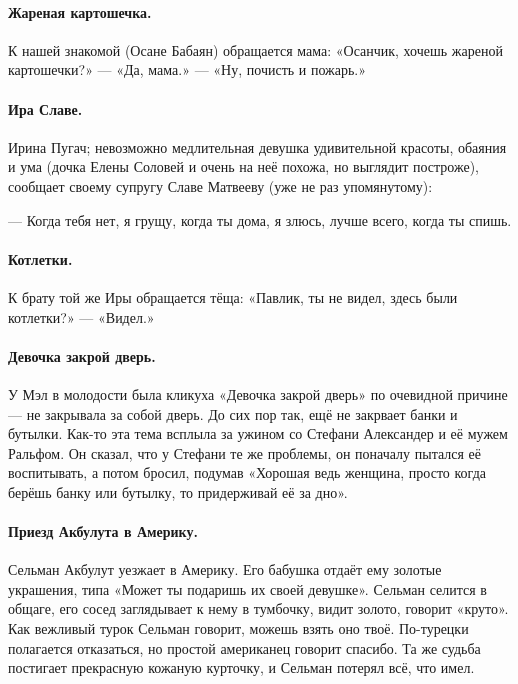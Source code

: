 \documentclass{book}
\begin{document}
\paragraph{Жареная картошечка.}
К нашей знакомой (Осане Бабаян) обращается мама:
«Осанчик, хочешь жареной картошечки?» --- «Да, мама.» --- «Ну, почисть и пожарь.»

\paragraph{Ира Славе.}
Ирина Пугач; невозможно медлительная девушка удивительной красоты, обаяния и ума (дочка Елены Соловей и очень на неё похожа, но выглядит построже), сообщает своему супругу Славе Матвееву (уже не раз упомянутому):

--- Когда тебя нет, я грущу, когда ты дома, я злюсь, лучше всего, когда ты спишь.

\paragraph{Котлетки.}
К брату той же Иры обращается тёща:
«Павлик, ты не видел, здесь были котлетки?» --- «Видел.»

\paragraph{Девочка закрой дверь.}
У Мэл в молодости была кликуха «Девочка закрой дверь» по очевидной причине --- не закрывала за собой дверь.
До сих пор так, ещё не закрвает банки и бутылки.
Как-то эта тема всплыла за ужином со Стефани Александер и её мужем Ральфом.
Он сказал, что у Стефани те же проблемы, он поначалу пытался её воспитывать, а потом бросил, подумав «Хорошая ведь женщина, просто когда берёшь банку или бутылку, то придерживай её за дно».

\paragraph{Приезд Акбулута в Америку.}
Сельман Акбулут уезжает в Америку.
Его бабушка отдаёт ему золотые украшения, типа «Может ты подаришь их своей девушке».
Сельман селится в общаге, его сосед заглядывает к нему в тумбочку, видит золото, говорит «круто».
Как вежливый турок Сельман говорит, можешь взять оно твоё.
По-турецки полагается отказаться, но простой американец говорит спасибо.
Та же судьба постигает прекрасную кожаную курточку,
и Сельман потерял всё, что имел.
\end{document}
